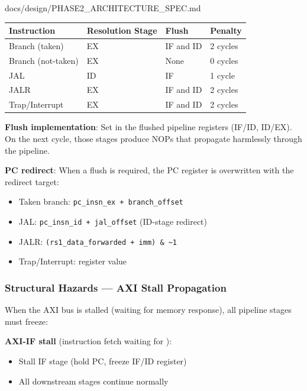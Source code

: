\begin{relocated}{docs/design/PHASE2_ARCHITECTURE_SPEC.md}
{
\begin{longtable}[]{@{}llll@{}}
\toprule\noalign{}
Instruction & Resolution Stage & Flush & Penalty \\
\midrule\noalign{}
\endhead
\bottomrule\noalign{}
\endlastfoot
Branch (taken) & EX & IF and ID & 2 cycles \\
Branch (not-taken) & EX & None & 0 cycles \\
JAL & ID & IF & 1 cycle \\
JALR & EX & IF and ID & 2 cycles \\
Trap/\allowbreak{}Interrupt & EX & IF and ID & 2 cycles \\
\end{longtable}
}

\textbf{Flush implementation}: Set  in the flushed
pipeline registers (IF/ID, ID/EX). On the next cycle, those stages
produce NOPs that propagate harmlessly through the pipeline.

\textbf{PC redirect}: When a flush is required, the PC register is
overwritten with the redirect target:

\begin{itemize}
\tightlist
\item
  Taken branch:
  \texttt{pc\_\allowbreak{}insn\_\allowbreak{}ex\ +\allowbreak{}\ branch\_\allowbreak{}offset}
\item
  JAL:
  \texttt{pc\_\allowbreak{}insn\_\allowbreak{}id\ +\allowbreak{}\ jal\_\allowbreak{}offset}
  (ID-stage redirect)
\item
  JALR:
  \texttt{(rs1\_\allowbreak{}data\_\allowbreak{}forwarded\ +\allowbreak{}\ imm)\ \&\ \textasciitilde{}1}
\item
  Trap/\allowbreak{}Interrupt:  register value
\end{itemize}

\subsubsection{Structural Hazards --- AXI Stall Propagation}\label{ds:ch:phase2-architecture:34-structural-hazards-axi-stall-propagation}

When the AXI bus is stalled (waiting for memory response), all pipeline
stages must freeze:

\textbf{AXI-IF stall} (instruction fetch waiting for ):

\begin{itemize}
\tightlist
\item
  Stall IF stage (hold PC, freeze IF/ID register)
\item
  All downstream stages continue normally
\end{itemize}


\end{relocated}
